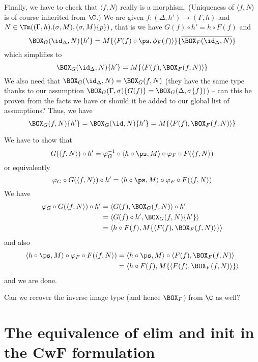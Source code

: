 \documentclass{article}
\newcommand{\isoFL}{\ensuremath{\phi_{F}}} %
\begin{document}
Finally, we have to check that $\langle f, N \rangle$ really is a
morphism. (Uniqueness of $\langle f, N\rangle$ is of course inherited
from $\C$.)  We are given $f : (\Delta, h') \to (\Gamma, h)$ and $N
\in \Tm((\Gamma, h).(\sigma, M), (\sigma, M)\{p\})$, that is we have
$G(f) \circ h' = h \circ F(f)$ and
\[
\BOX_G(\id_{\Delta}, N)\{h'\} = M\{\langle F(f) \circ \ps, \isoFL(f)\rangle\}\{\overline{\BOX_F(\id_{\Delta}, N)}\}
\]
which simplifies to
\[
\BOX_G(\id_{\Delta}, N)\{h'\} = M\{\langle F(f), \BOX_F(f, N)\rangle\}
\]
We also need that $\BOX_G(\id_{\Delta}, N) = \BOX_G(f, N)$ (they
have the same type thanks to our assumption $\BOX_G(\Gamma,
\sigma)\{G(f)\} = \BOX_G(\Delta, \sigma\{f\})$) -- can this be
proven from the facts we have or should it be added to our global list
of assumptions? Thus, we have
\[
\BOX_G(f, N)\{h'\} = \BOX_G(\id, N)\{h'\} = M\{\langle F(f), \BOX_F(f, N)\rangle\}
\]

We have to show that
\[
G(\langle f, N\rangle) \circ h' = \varphi_G^{-1} \circ \langle h \circ \ps, M\rangle \circ \varphi_F \circ F(\langle f, N\rangle)
\]
or equivalently
\[
\varphi_G \circ G(\langle f, N\rangle) \circ h' = \langle h \circ \ps, M\rangle \circ \varphi_F \circ F(\langle f, N\rangle)
\]
We have
\begin{align*}
  \varphi_G \circ G(\langle f, N\rangle) \circ h'
 &= \langle G(f), \BOX_G(f, N)\rangle \circ h' \\
 &= \langle G(f) \circ h', \BOX_G(f, N)\{h'\}\rangle \\
 &= \langle h \circ F(f), M\{\langle F(f), \BOX_F(f, N)\rangle\}\rangle \\
\end{align*}
and also
\begin{align*}
  \langle h \circ \ps, M\rangle \circ \varphi_F \circ F(\langle f, N\rangle)
 &= \langle h \circ \ps, M\rangle \circ \langle F(f), \BOX_F(f, N)\rangle \\
 &= \langle h \circ F(f), M\{\langle F(f), \BOX_F(f, N)\rangle\}\rangle \\
\end{align*}
and we are done.

\begin{question}
  Can we recover the inverse image type (and hence $\BOX_F$) from
  $\C$ as well?
\end{question}

\section{The equivalence of elim and init in the CwF formulation}
\end{document}
